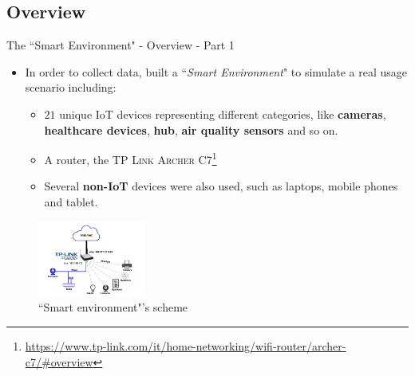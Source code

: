 \documentclass[10pt]{beamer}
\begin{document}
\subsection{Overview}
\begin{frame}{The ``Smart Environment" - Overview - Part 1}

\begin{itemize}
\justifying
\item In order to collect data, \citet{ITPAReport} built a ``\textit{Smart Environment}" to simulate a real usage scenario including:

\begin{itemize}
\justifying
\item $21$ unique IoT devices representing different categories, like \textbf{cameras}, \textbf{healthcare devices}, \textbf{hub}, \textbf{air quality sensors} and so on.

\item A router, the \textsc{TP Link Archer C7}\footnote{\tiny\url{https://www.tp-link.com/it/home-networking/wifi-router/archer-c7/\#overview}}

\item Several \textbf{non-IoT} devices were also used, such as laptops, mobile phones and tablet.

\end{itemize}
\end{itemize}

\begin{figure}
  \caption{``Smart environment"'s scheme}
  \includegraphics[width=100pt]{Topology.png}
\end{figure}

\end{frame} 
\end{document}
